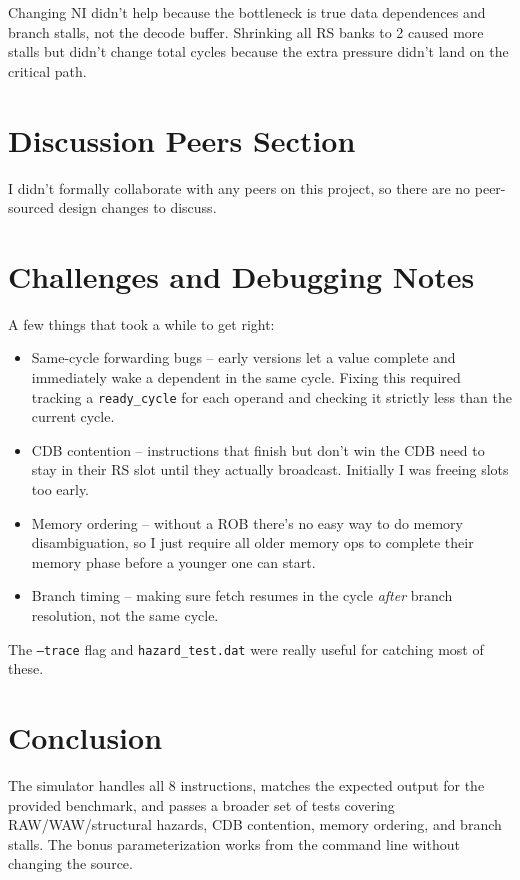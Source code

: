 \documentclass[11pt]{article}
\begin{document}
Changing NI didn't help because the bottleneck is true data dependences and branch stalls, not the decode buffer. Shrinking all RS banks to 2 caused more stalls but didn't change total cycles because the extra pressure didn't land on the critical path.

\section{Discussion Peers Section}
I didn't formally collaborate with any peers on this project, so there are no peer-sourced design changes to discuss.

\section{Challenges and Debugging Notes}
A few things that took a while to get right:

\begin{itemize}
\item Same-cycle forwarding bugs -- early versions let a value complete and immediately wake a dependent in the same cycle. Fixing this required tracking a \texttt{ready\_cycle} for each operand and checking it strictly less than the current cycle.
\item CDB contention -- instructions that finish but don't win the CDB need to stay in their RS slot until they actually broadcast. Initially I was freeing slots too early.
\item Memory ordering -- without a ROB there's no easy way to do memory disambiguation, so I just require all older memory ops to complete their memory phase before a younger one can start.
\item Branch timing -- making sure fetch resumes in the cycle \textit{after} branch resolution, not the same cycle.
\end{itemize}

The \texttt{--trace} flag and \texttt{hazard\_test.dat} were really useful for catching most of these.

\section{Conclusion}
The simulator handles all 8 instructions, matches the expected output for the provided benchmark, and passes a broader set of tests covering RAW/WAW/structural hazards, CDB contention, memory ordering, and branch stalls. The bonus parameterization works from the command line without changing the source.
\end{document}
